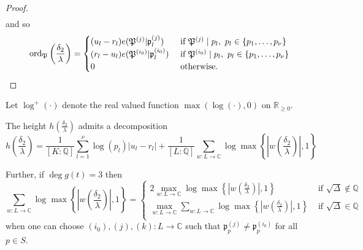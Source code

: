 \begin{proof}
\begin{align*}
\end{align*}
and so
\[\operatorname{ord}_{\mathfrak{P}}\left( \frac{\delta_2}{\lambda}\right)=
\begin{cases}
(u_l - r_l)e(\mathfrak{P}^{(j)}|\mathfrak{p}_l^{(j)})	
	& \textnormal{ if } \mathfrak{P}^{(j)} \mid p_l , \ p_l \in \{p_1,\dots, p_{\nu}\}\\
(r_l - u_l)e(\mathfrak{P}^{(i_0)}|\mathfrak{p}_l^{(i_0)})
	& \textnormal{ if } \mathfrak{P}^{(i_0)}\mid p_l, \ p_l \in \{p_1,\dots, p_{\nu}\}\\
0 	& \textnormal{ otherwise}.
\end{cases}\]
\end{proof}

Let $\log^+(\cdot)$ denote the real valued function $\max(\log(\cdot), 0)$ on $\mathbb{R}_{\geq 0}$. 

\begin{proposition}\label{prop:heightdecomp}
The height $h\left(\frac{\delta_2}{\lambda}\right)$ admits a decomposition
\[h\left(\frac{\delta_2}{\lambda}\right) = \frac{1}{[K:\mathbb{Q}]}\sum_{l = 1}^{\nu} \log(p_l)|u_l - r_l| + \frac{1}{[L:\mathbb{Q}]}\sum_{w :L \to \mathbb{C}} \log \max \left\{ \left|w\left(\frac{\delta_2}{\lambda}\right)\right|, 1\right\} \]

Further, if $\deg{g(t)}=3$ then 
\[\sum_{w :L \to \mathbb{C}} \log \max \left\{ \left|w\left(\frac{\delta_2}{\lambda}\right)\right|, 1\right\} = 
\begin{cases}
2\max_{w:L\to \mathbb{C}} \log \max \left\{ \left|w\left(\frac{\delta_2}{\lambda}\right)\right|, 1\right\} & \text{ if } \sqrt{\Delta}\notin\mathbb{Q} \\
\max_{w:L\to \mathbb{C}}\sum_{w :L \to \mathbb{C}} \log \max \left\{ \left|w\left(\frac{\delta_2}{\lambda}\right)\right|, 1\right\} & \text{ if } \sqrt{\Delta}\in\mathbb{Q} \\
\end{cases}\]
when one can choose $(i_0),(j), (k) : L \to \mathbb{C}$ such that $\mathfrak{p}_{p}^{(j)} \neq \mathfrak{p}_{p}^{(i_0)}$ for all $p \in S$. 
\end{proposition}

